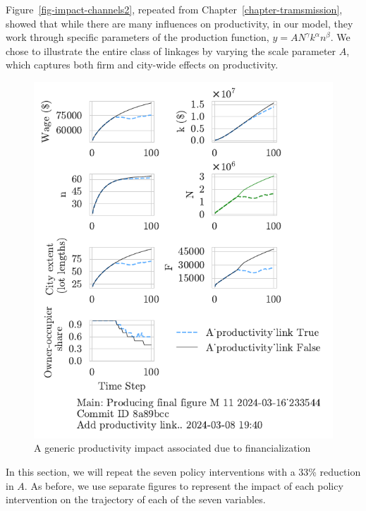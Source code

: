 Figure~\ref{fig-impact-channels2}, repeated from Chapter~\ref{chapter-tramsmission}, showed that while there are many influences on productivity, in our model, they work through specific parameters of the production function, $y=AN^\gamma k^\alpha n^\beta$. 
We chose to illustrate the entire class of linkages by varying the scale parameter $A$, which captures both firm and city-wide effects on productivity. 




\begin{figure}[h!tb] 
    \centering
    \includegraphics[scale=1, trim={0 1.4cm .8cm 0},clip]{fig/generic-productivity-impact_233544.pdf} 
    \caption{A generic productivity impact associated due to financialization}
    \label{fig:generic-productivity-impact}
\end{figure}

In this section, we will repeat the seven policy interventions with a 33\% reduction in $A$.  As before, we use separate figures to represent the impact of each policy intervention on the trajectory of each of the seven variables. 


\newpage
